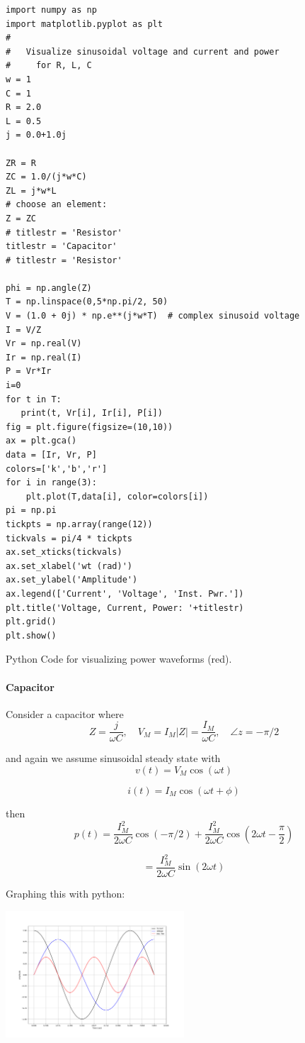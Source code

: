 \begin{listing}
\begin{verbatim}
import numpy as np
import matplotlib.pyplot as plt
#
#   Visualize sinusoidal voltage and current and power
#     for R, L, C
w = 1
C = 1
R = 2.0
L = 0.5
j = 0.0+1.0j

ZR = R
ZC = 1.0/(j*w*C)
ZL = j*w*L
# choose an element:
Z = ZC
# titlestr = 'Resistor'
titlestr = 'Capacitor'
# titlestr = 'Resistor'

phi = np.angle(Z)
T = np.linspace(0,5*np.pi/2, 50)
V = (1.0 + 0j) * np.e**(j*w*T)  # complex sinusoid voltage
I = V/Z
Vr = np.real(V)
Ir = np.real(I)
P = Vr*Ir
i=0
for t in T:
   print(t, Vr[i], Ir[i], P[i])
fig = plt.figure(figsize=(10,10))
ax = plt.gca()
data = [Ir, Vr, P]
colors=['k','b','r']
for i in range(3):
    plt.plot(T,data[i], color=colors[i])
pi = np.pi
tickpts = np.array(range(12))
tickvals = pi/4 * tickpts
ax.set_xticks(tickvals)
ax.set_xlabel('wt (rad)')
ax.set_ylabel('Amplitude')
ax.legend(['Current', 'Voltage', 'Inst. Pwr.'])
plt.title('Voltage, Current, Power: '+titlestr)
plt.grid()
plt.show()
\end{verbatim}
\caption{Python Code for visualizing power waveforms (red).}
\label{lst:basicTustin}
\end{listing}


\paragraph{Capacitor}
Consider a capacitor where
\[
Z = \frac{j}{\omega C}, \quad V_M = I_M |Z| = \frac{I_M}{\omega C}, \quad \angle z = -\pi/2
\]

and again we assume sinusoidal steady state with
\[
v(t) = V_M \cos(\omega t)
\]

\[
i(t) = I_M \cos(\omega t + \phi)
\]

then
\[
p(t) = \frac{I_M^2}{2\omega C} \cos(-\pi/2) + \frac{I_M^2}{2\omega C} \cos(2\omega t  - \frac{\pi}{2})
\]

\[
= \frac{I_M^2}{2\omega C} \sin(2\omega t  )
\]

Graphing this with python:

\includegraphics[width=0.5\textwidth]{figsChapt03/US73216.png}  %


